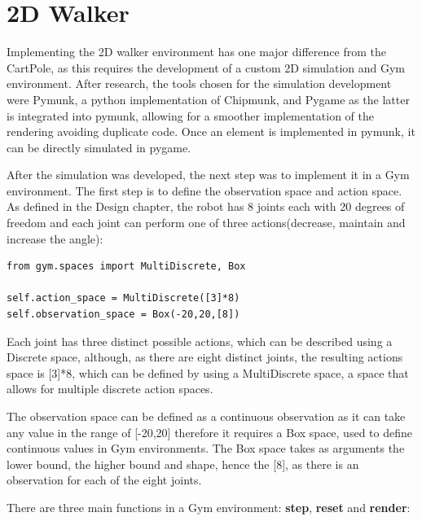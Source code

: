 \section{2D Walker}
Implementing the 2D walker environment has one major difference from the CartPole, as this requires the development of a custom 2D simulation and Gym environment. After research, the tools chosen for the simulation development were Pymunk\cite{pymunk}, a python implementation of Chipmunk\cite{chipmunk}, and Pygame\cite{pygame} as the latter is integrated into pymunk, allowing for a smoother implementation of the rendering avoiding duplicate code. Once an element is implemented in pymunk, it can be directly simulated in pygame.


After the simulation was developed, the next step was to implement it in a Gym environment.
The first step is to define the observation space and action space.
As defined in the Design chapter, the robot has 8 joints each with 20 degrees of freedom and each joint can perform one of three actions(decrease, maintain and increase the angle):
    \lstset{language=Python}
    \lstset{frame=lines}
\lstset{basicstyle=\footnotesize}
\begin{lstlisting}
from gym.spaces import MultiDiscrete, Box

self.action_space = MultiDiscrete([3]*8)
self.observation_space = Box(-20,20,[8])
\end{lstlisting}

Each joint has three distinct possible actions, which can be described using a Discrete space, although, as there are eight distinct joints, the resulting actions space is [3]*8, which can be defined by using a MultiDiscrete space, a space that allows for multiple discrete action spaces.

The observation space can be defined as a continuous observation as it can take any value in the range of [-20,20] therefore it requires a Box space, used to define continuous values in Gym environments. The Box space takes as arguments the lower bound, the higher bound and shape, hence the [8], as there is an observation for each of the eight joints.

There are three main functions in a Gym environment: \textbf{step}, \textbf{reset} and \textbf{render}:

